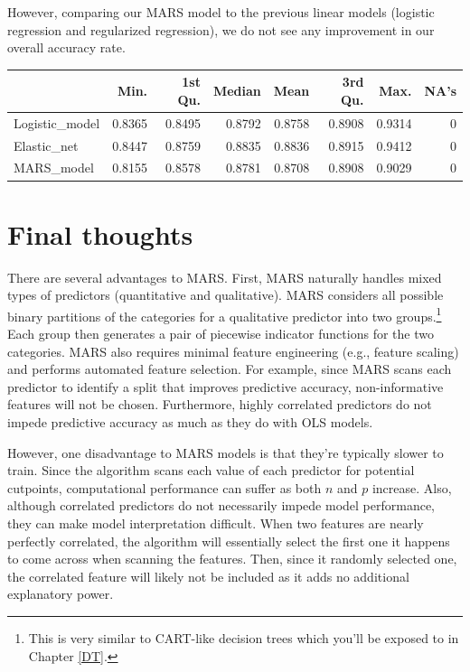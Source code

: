 \documentclass[]{krantz}
\begin{document}
However, comparing our MARS model to the previous linear models (logistic regression and regularized regression), we do not see any improvement in our overall accuracy rate.

\begin{tabular}{l|r|r|r|r|r|r|r}
\hline
  & Min. & 1st Qu. & Median & Mean & 3rd Qu. & Max. & NA's\\
\hline
Logistic\_model & 0.8365 & 0.8495 & 0.8792 & 0.8758 & 0.8908 & 0.9314 & 0\\
\hline
Elastic\_net & 0.8447 & 0.8759 & 0.8835 & 0.8836 & 0.8915 & 0.9412 & 0\\
\hline
MARS\_model & 0.8155 & 0.8578 & 0.8781 & 0.8708 & 0.8908 & 0.9029 & 0\\
\hline
\end{tabular}

\hypertarget{final-thoughts-3}{%
\section{Final thoughts}\label{final-thoughts-3}}

There are several advantages to MARS. First, MARS naturally handles mixed types of predictors (quantitative and qualitative). MARS considers all possible binary partitions of the categories for a qualitative predictor into two groups.\footnote{This is very similar to CART-like decision trees which you'll be exposed to in Chapter \ref{DT}.} Each group then generates a pair of piecewise indicator functions for the two categories. MARS also requires minimal feature engineering (e.g., feature scaling) and performs automated feature selection. For example, since MARS scans each predictor to identify a split that improves predictive accuracy, non-informative features will not be chosen. Furthermore, highly correlated predictors do not impede predictive accuracy as much as they do with OLS models.

However, one disadvantage to MARS models is that they're typically slower to train. Since the algorithm scans each value of each predictor for potential cutpoints, computational performance can suffer as both \(n\) and \(p\) increase. Also, although correlated predictors do not necessarily impede model performance, they can make model interpretation difficult. When two features are nearly perfectly correlated, the algorithm will essentially select the first one it happens to come across when scanning the features. Then, since it randomly selected one, the correlated feature will likely not be included as it adds no additional explanatory power.
\end{document}
